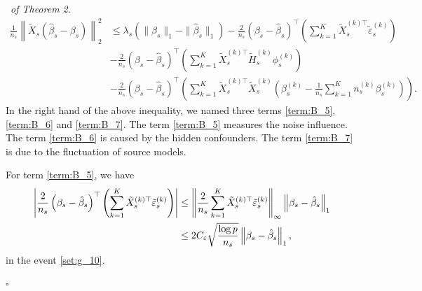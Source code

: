 \documentclass[12pt]{article}
\newenvironment{pf}{{\noindent \it Proof}\ }{\hfill $\square$\par}
\begin{document}
\begin{pf}{\it of Theorem 2. }
\begin{align}
        \frac{1}{n_s}\left\|\tilde{X}_s\left(\hat{\beta}_s -\beta_s\right)\right\|_2^2 & \le \lambda_s\left(\|\beta_s\|_1 - \|\hat{\beta}_s\|_1\right)  -\frac{2}{n_s}\left(\beta_s - \hat{\beta}_s\right)^\top\left(\sum_{k=1}^K \tilde{X}_s^{(k)\top} \tilde{\varepsilon}_s^{(k)}\right)\label{term:B_5}\tag{$B_5$}\\ &-
        \frac{2}{n_s}\left(\beta_s - \hat{\beta}_s\right)^\top\left(\sum_{k=1}^K \tilde{X}_s^{(k)\top}\tilde{H}_s^{(k)}\phi_s^{(k)}\right)\label{term:B_6}\tag{$B_6$}\\ &- \frac{2}{n_s}\left(\beta_s - \hat{\beta}_s\right)^\top \left(\sum_{k=1}^K \tilde{X}_s^{(k)\top}\tilde{X}_s^{(k)}\left(\beta_s^{(k)}-\frac{1}{n_s}\sum_{k=1}^K n_s^{(k)}\beta_s^{(k)}\right)\right) \label{term:B_7}\tag{$B_7$}. 
    \end{align}
    In the right hand of the above inequality, we named three terms \ref{term:B_5}, \ref{term:B_6} and \ref{term:B_7}. The term \ref{term:B_5} measures the noise influence. The term \ref{term:B_6} is caused by the hidden confounders. The term \ref{term:B_7} is due to the fluctuation of source models. 

    For term \ref{term:B_5}, we have 
    \begin{align}
        \left|\frac{2}{n_s}\left(\beta_s - \hat{\beta}_s\right)^\top\left(\sum_{k=1}^K \tilde{X}_s^{(k)\top} \tilde{\varepsilon}_s^{(k)}\right)\right| &\le  \left\|\frac{2}{n_s}\sum_{k=1}^K \tilde{X}_s^{(k)\top} \tilde{\varepsilon}_s^{(k)}\right\|_{\infty} \left\|\beta_s - \hat{\beta}_s\right\|_1\notag \\&\le 
        2C_\varepsilon \sqrt{\frac{\log p}{n_s}}\left\|\beta_s - \hat{\beta}_s\right\|_1\label{eq:error_bound_B5},
    \end{align}
    in the event \ref{set:g_10}.


\end{pf}
\end{document}
